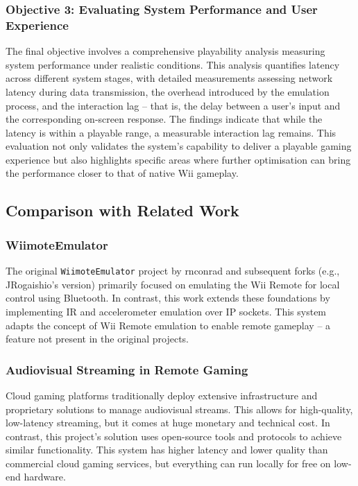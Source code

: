 \subsubsection{Objective 3: Evaluating System Performance and User Experience}
The final objective involves a comprehensive playability analysis measuring
system performance under realistic conditions. This analysis quantifies latency
across different system stages, with detailed measurements assessing network
latency during data transmission, the overhead introduced by the emulation
process, and the interaction lag\cite{volkerseekerBestPaper} -- that is, the delay between a user’s input
and the corresponding on-screen response. The findings indicate that while the
latency is within a playable range, a measurable interaction lag remains. This
evaluation not only validates the system's capability to deliver a playable
gaming experience but also highlights specific areas where further optimisation
can bring the performance closer to that of native Wii gameplay.


\subsection{Comparison with Related Work}

\subsubsection{WiimoteEmulator}
The original \texttt{WiimoteEmulator} project by rnconrad and subsequent forks
(e.g., JRogaishio's version) primarily focused on emulating the Wii Remote for
local control using Bluetooth. In contrast, this work extends these foundations
by implementing IR and accelerometer emulation over IP sockets. This system adapts the concept of
Wii Remote emulation to enable remote gameplay -- a feature not present in the
original projects.

\subsubsection{Audiovisual Streaming in Remote Gaming}
Cloud gaming platforms traditionally deploy extensive infrastructure and
proprietary solutions to manage audiovisual streams. This allows for
high-quality, low-latency streaming, but it comes at huge monetary and technical
cost\cite{cloud_survey}. In contrast, this project's solution uses open-source tools and
protocols to achieve similar functionality. This system has higher latency and lower quality than
commercial cloud gaming services, but everything can run locally for free on low-end hardware.

